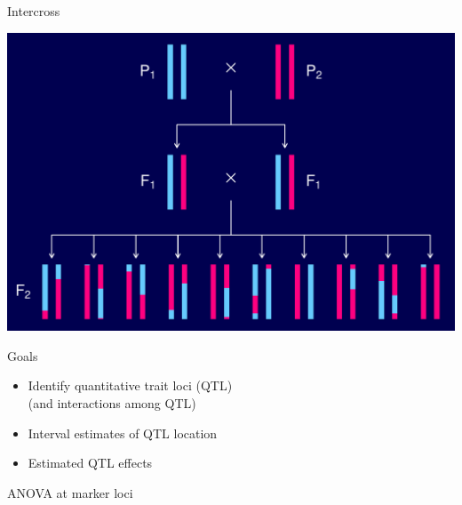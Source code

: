 \documentclass[12pt]{article}
\newcommand{\headsize}{\fontsize{35}{35} \selectfont}
\newcommand{\smallsize}{\fontsize{25}{30} \selectfont}
\begin{document}
\headsize \color{myyellow}
\hfill \begin{minipage}{5.75in}
\centering
Intercross
\end{minipage}

\vfill

\centerline{\includegraphics{Figs/intercross.pdf}}

\newpage

\headsize \color{myyellow}
\hfill \begin{minipage}{5.75in}
\centering
Goals
\end{minipage}

\vspace{3cm}

\color{mywhite} \smallsize

\hfill \begin{minipage}[t]{9.5in}
\begin{itemize}
\itemsep24pt
\item Identify quantitative trait loci (QTL)\\[6pt]
   {\color{myblue}   (and interactions among QTL)}
\item Interval estimates of QTL location
\item Estimated QTL effects
\end{itemize} \end{minipage}

\newpage



\headsize \color{myyellow}
\hfill\begin{minipage}{5.75in}
\centering
ANOVA at marker loci
\end{minipage}

\vspace{2cm}
\end{document}
